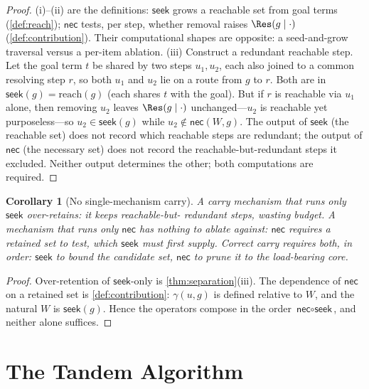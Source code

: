 \documentclass[11pt,a4paper]{article}
\theoremstyle{thmstyle}
\newtheorem{corollary}[theorem]{Corollary}
\theoremstyle{definition}
\theoremstyle{remark}
\newcommand{\goal}{g}                   %
\newcommand{\reach}{\mathrm{reach}}
\newcommand{\contrib}{\gamma}           %
\newcommand{\seek}{\textsf{seek}}
\newcommand{\nec}{\textsf{nec}}
\begin{document}
\begin{proof}
(i)--(ii) are the definitions: $\seek$ grows a reachable set from goal terms
(\cref{def:reach}); $\nec$ tests, per step, whether removal raises
$\Res(\goal\mid\cdot)$ (\cref{def:contribution}). Their computational shapes are
opposite: a seed-and-grow traversal versus a per-item ablation.
(iii) Construct a redundant reachable step. Let the goal term $t$ be shared by
two steps $u_1,u_2$, each also joined to a common resolving step $r$, so both
$u_1$ and $u_2$ lie on a route from $\goal$ to $r$. Both are in
$\seek(\goal)=\reach(\goal)$ (each shares $t$ with the goal). But if $r$ is
reachable via $u_1$ alone, then removing $u_2$ leaves $\Res(\goal\mid\cdot)$
unchanged---$u_2$ is reachable yet purposeless---so $u_2\in\seek(\goal)$ while
$u_2\notin\nec(W,\goal)$. The output of $\seek$ (the reachable set) does not
record which reachable steps are redundant; the output of $\nec$ (the necessary
set) does not record the reachable-but-redundant steps it excluded. Neither
output determines the other; both computations are required.
\end{proof}

\begin{corollary}[No single-mechanism carry]
\label{cor:no-single}
A carry mechanism that runs only $\seek$ over-retains: it keeps reachable-but-%
redundant steps, wasting budget. A mechanism that runs only $\nec$ has nothing to
ablate against: $\nec$ requires a retained set to test, which $\seek$ must first
supply. Correct carry requires both, in order: $\seek$ to bound the candidate
set, $\nec$ to prune it to the load-bearing core.
\end{corollary}

\begin{proof}
Over-retention of $\seek$-only is \cref{thm:separation}(iii). The dependence of
$\nec$ on a retained set is \cref{def:contribution}: $\contrib(u,\goal)$ is
defined relative to $W$, and the natural $W$ is $\seek(\goal)$. Hence the
operators compose in the order $\nec\circ\seek$, and neither alone suffices.
\end{proof}

\section{The Tandem Algorithm}
\label{sec:tandem}
\end{document}
